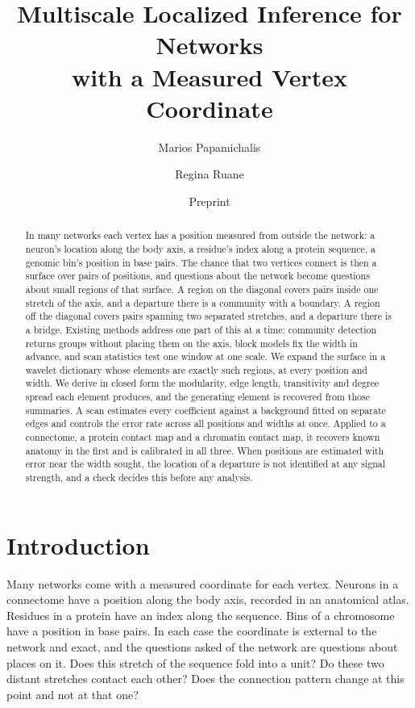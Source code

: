 \documentclass[11pt]{article}
\title{Multiscale Localized Inference for Networks\\with a Measured Vertex Coordinate}
\author{Marios Papamichalis \and Regina Ruane}
\date{Preprint}
\theoremstyle{definition}
\newcommand{\1}{\mathbf 1}\newcommand{\op}{\operatorname}
\begin{document}
\maketitle
\begin{abstract}
In many networks each vertex has a position measured from outside the network:
a neuron's location along the body axis, a residue's index along a protein
sequence, a genomic bin's position in base pairs.  The chance that two
vertices connect is then a surface over pairs of positions, and questions
about the network become questions about small regions of that surface.  A
region on the diagonal covers pairs inside one stretch of the axis, and a
departure there is a community with a boundary.  A region off the diagonal
covers pairs spanning two separated stretches, and a departure there is a
bridge.  Existing methods address one part of this at a time: community
detection returns groups without placing them on the axis, block models fix
the width in advance, and scan statistics test one window at one scale.  We
expand the surface in a wavelet dictionary whose elements are exactly such
regions, at every position and width.  We derive in closed form the
modularity, edge length, transitivity and degree spread each element
produces, and the generating element is recovered from those summaries.  A
scan estimates every coefficient against a background fitted on separate
edges and controls the error rate across all positions and widths at once.
Applied to a connectome, a protein contact map and a chromatin contact map, it
recovers known anatomy in the first and is calibrated in all three.  When positions are estimated with error near
the width sought, the location of a departure is not identified at any signal
strength, and a check decides this before any analysis.
\end{abstract}


\section{Introduction}                                          \label{sec:intro}

Many networks come with a measured coordinate for each vertex.  Neurons in a
connectome have a position along the body axis, recorded in an anatomical
atlas.  Residues in a protein have an index along the sequence.  Bins of a
chromosome have a position in base pairs.  In each case the coordinate is
external to the network and exact, and the questions asked of the network are
questions about places on it.  Does this stretch of the sequence fold into a
unit?  Do these two distant stretches contact each other?  Does the connection
pattern change at this point and not at that one?
\end{document}
